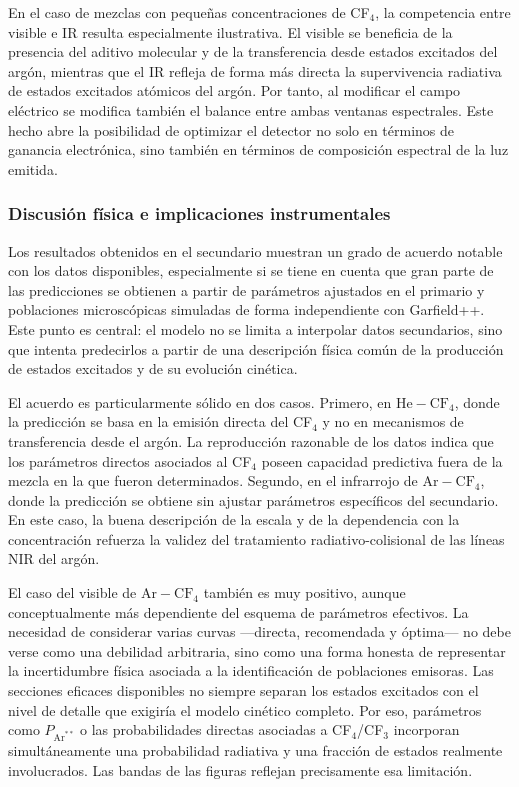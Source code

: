 \documentclass[12pt,a4paper]{article}
\newcommand{\He}{\mathrm{He}}
\newcommand{\Ar}{\mathrm{Ar}}
\newcommand{\CF}{\mathrm{CF}}
\begin{document}
En el caso de mezclas con pequeñas concentraciones de CF$_4$, la competencia entre visible e IR resulta especialmente ilustrativa. El visible se beneficia de la presencia del aditivo molecular y de la transferencia desde estados excitados del argón, mientras que el IR refleja de forma más directa la supervivencia radiativa de estados excitados atómicos del argón. Por tanto, al modificar el campo eléctrico se modifica también el balance entre ambas ventanas espectrales. Este hecho abre la posibilidad de optimizar el detector no solo en términos de ganancia electrónica, sino también en términos de composición espectral de la luz emitida.

\subsubsection{Discusión física e implicaciones instrumentales}

Los resultados obtenidos en el secundario muestran un grado de acuerdo notable con los datos disponibles, especialmente si se tiene en cuenta que gran parte de las predicciones se obtienen a partir de parámetros ajustados en el primario y poblaciones microscópicas simuladas de forma independiente con Garfield++. Este punto es central: el modelo no se limita a interpolar datos secundarios, sino que intenta predecirlos a partir de una descripción física común de la producción de estados excitados y de su evolución cinética.

El acuerdo es particularmente sólido en dos casos. Primero, en $\He-\CF_4$, donde la predicción se basa en la emisión directa del CF$_4$ y no en mecanismos de transferencia desde el argón. La reproducción razonable de los datos indica que los parámetros directos asociados al CF$_4$ poseen capacidad predictiva fuera de la mezcla en la que fueron determinados. Segundo, en el infrarrojo de $\Ar-\CF_4$, donde la predicción se obtiene sin ajustar parámetros específicos del secundario. En este caso, la buena descripción de la escala y de la dependencia con la concentración refuerza la validez del tratamiento radiativo-colisional de las líneas NIR del argón.

El caso del visible de $\Ar-\CF_4$ también es muy positivo, aunque conceptualmente más dependiente del esquema de parámetros efectivos. La necesidad de considerar varias curvas —directa, recomendada y óptima— no debe verse como una debilidad arbitraria, sino como una forma honesta de representar la incertidumbre física asociada a la identificación de poblaciones emisoras. Las secciones eficaces disponibles no siempre separan los estados excitados con el nivel de detalle que exigiría el modelo cinético completo. Por eso, parámetros como $P_{\Ar^{**}}$ o las probabilidades directas asociadas a CF$_4$/CF$_3$ incorporan simultáneamente una probabilidad radiativa y una fracción de estados realmente involucrados. Las bandas de las figuras reflejan precisamente esa limitación.
\end{document}
